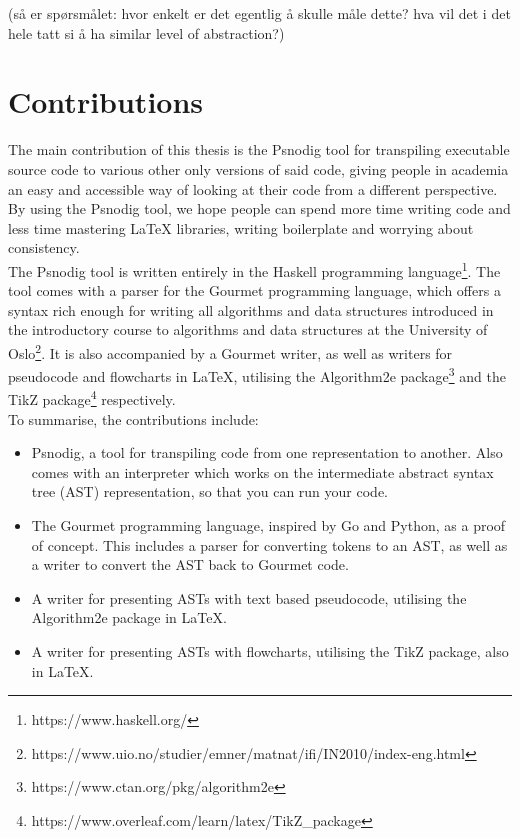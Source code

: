 (så er spørsmålet: hvor enkelt er det egentlig å skulle måle dette? hva vil det i det hele tatt si å ha similar level of abstraction?)

\section{Contributions}

The main contribution of this thesis is the Psnodig tool for transpiling executable source code to various other only versions of said code, giving people in academia an easy and accessible way of looking at their code from a different perspective. By using the Psnodig tool, we hope people can spend more time writing code and less time mastering LaTeX libraries, writing boilerplate and worrying about consistency. \hfill \\

The Psnodig tool is written entirely in the Haskell programming language\footnote{https://www.haskell.org/}. The tool comes with a parser for the Gourmet programming language, which offers a syntax rich enough for writing all algorithms and data structures introduced in the introductory course to algorithms and data structures at the University of Oslo\footnote{https://www.uio.no/studier/emner/matnat/ifi/IN2010/index-eng.html}. It is also accompanied by a Gourmet writer, as well as writers for pseudocode and flowcharts in LaTeX, utilising the Algorithm2e package\footnote{https://www.ctan.org/pkg/algorithm2e} and the TikZ package\footnote{https://www.overleaf.com/learn/latex/TikZ\_package} respectively. \hfill \\

To summarise, the contributions include:
\begin{itemize}
    \item Psnodig, a tool for transpiling code from one representation to another. Also comes with an interpreter which works on the intermediate abstract syntax tree (AST) representation, so that you can run your code.
    \item The Gourmet programming language, inspired by Go and Python, as a proof of concept. This includes a parser for converting tokens to an AST, as well as a writer to convert the AST back to Gourmet code.
    \item A writer for presenting ASTs with text based pseudocode, utilising the Algorithm2e package in LaTeX.
    \item A writer for presenting ASTs with flowcharts, utilising the TikZ package, also in LaTeX.
\end{itemize}

